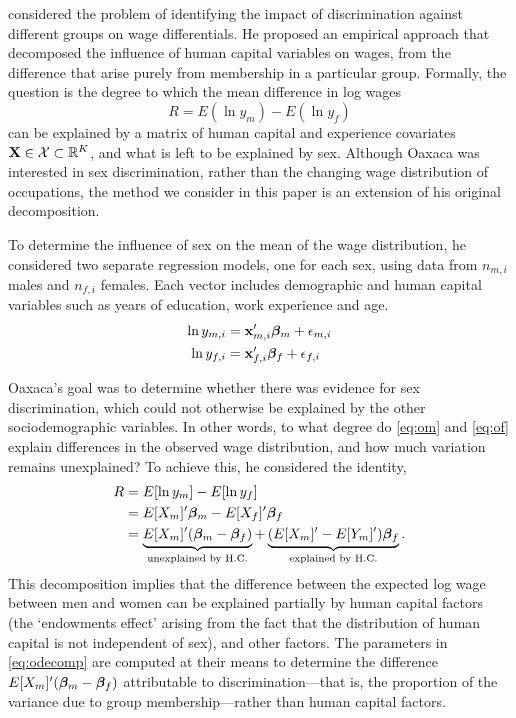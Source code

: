 \citet{Oaxaca1973} considered the problem of identifying the impact of discrimination against different groups on wage differentials. He proposed an empirical approach that decomposed the influence of human capital variables on wages, from the difference that arise purely from membership in a particular group. Formally, the question is the degree to which the mean difference in log wages 
$$ R = E(\ln y_m) - E(\ln y_f) $$ 
can be explained by a matrix of human capital and experience covariates $\mathbf{X}\in\mathcal{X}\subset\mathbb{R}^K$, and what is left to be explained by sex. Although Oaxaca was interested in sex discrimination, rather than the changing wage distribution of occupations, the method we consider in this paper is an extension of his original decomposition.

To determine the influence of sex on the mean of the wage distribution, he considered two separate regression models, one for each sex, using data from $n_{m,i}$ males and $n_{f,i}$ females. Each vector includes demographic and human capital variables such as years of education, work experience and age.
\begin{align}
  \ln y_{m,i} &= \mathbf{x}_{m,i}'\boldsymbol{\beta}_m + \epsilon_{m,i} \label{eq:om} \\
  \ln y_{f,i} &= \mathbf{x}_{f,i}'\boldsymbol{\beta}_f + \epsilon_{f,i} \label{eq:of}
\end{align}

Oaxaca's goal was to determine whether there was evidence for sex discrimination, which could not otherwise be explained by the other sociodemographic variables. In other words, to what degree do \eqref{eq:om} and \eqref{eq:of} explain differences in the observed wage distribution, and how much variation remains unexplained? To achieve this, he considered the identity,
\begin{align}
  R &= E[\ln y_{m}] - E[\ln y_{f}] \\
  &=  E[X_m]'\boldsymbol{\beta}_m -  E[X_f]'\boldsymbol{\beta}_f \notag \\
  &= \underbrace{E[X_m]'(\boldsymbol{\beta}_m - \boldsymbol{\beta}_f)}_{\text{unexplained by H.C.}} + \underbrace{(E[X_m]'-E[Y_m]')\boldsymbol{\beta}_f}_{\text{explained by H.C.}}. \label{eq:odecomp}
\end{align}
This decomposition implies that the difference between the expected log wage between men and women can be explained partially by human capital factors (the `endowments effect' arising from the fact that the distribution of human capital is not independent of sex), and other factors. The parameters in \eqref{eq:odecomp} are computed at their means to determine the difference $E[X_m]'(\boldsymbol{\beta}_m - \boldsymbol{\beta}_f)$ attributable to discrimination---that is, the proportion of the variance due to group membership---rather than human capital factors. 

